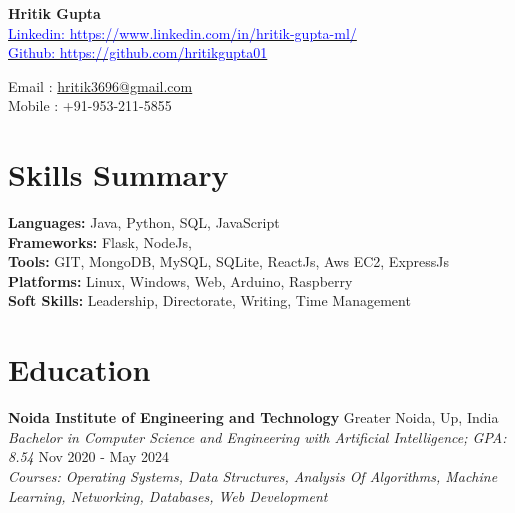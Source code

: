 \documentclass[11pt]{article}
\begin{document}
\begin{minipage}[t]{0.6\textwidth}
  {\LARGE\textbf{Hritik Gupta}} \\
  \vspace{2pt}
  \href{https://www.linkedin.com/in/hritik-gupta-ml/}{\textcolor{blue}{Linkedin: https://www.linkedin.com/in/hritik-gupta-ml/}} \\
  \href{https://github.com/hritikgupta01}{\textcolor{blue}{Github: https://github.com/hritikgupta01}}
\end{minipage}%
\begin{minipage}[t]{0.4\textwidth}
  \raggedleft
  Email : \href{mailto:hritik3696@gmail.com}{hritik3696@gmail.com} \\
  Mobile : +91-953-211-5855
\end{minipage}

\vspace{0.5em}

\section*{Skills Summary}
\textbf{Languages:} Java, Python, SQL, JavaScript \\
\textbf{Frameworks:} Flask, NodeJs, \\
\textbf{Tools:} GIT, MongoDB, MySQL, SQLite, ReactJs, Aws EC2, ExpressJs \\
\textbf{Platforms:} Linux, Windows, Web, Arduino, Raspberry \\
\textbf{Soft Skills:} Leadership, Directorate, Writing, Time Management

\section*{Education}
\textbf{Noida Institute of Engineering and Technology} \hfill Greater Noida, Up, India \\
\textit{Bachelor in Computer Science and Engineering with Artificial Intelligence; GPA: 8.54} \hfill Nov 2020 - May 2024 \\
\textit{Courses: Operating Systems, Data Structures, Analysis Of Algorithms, Machine Learning, Networking, Databases, Web Development}

\end{document}
